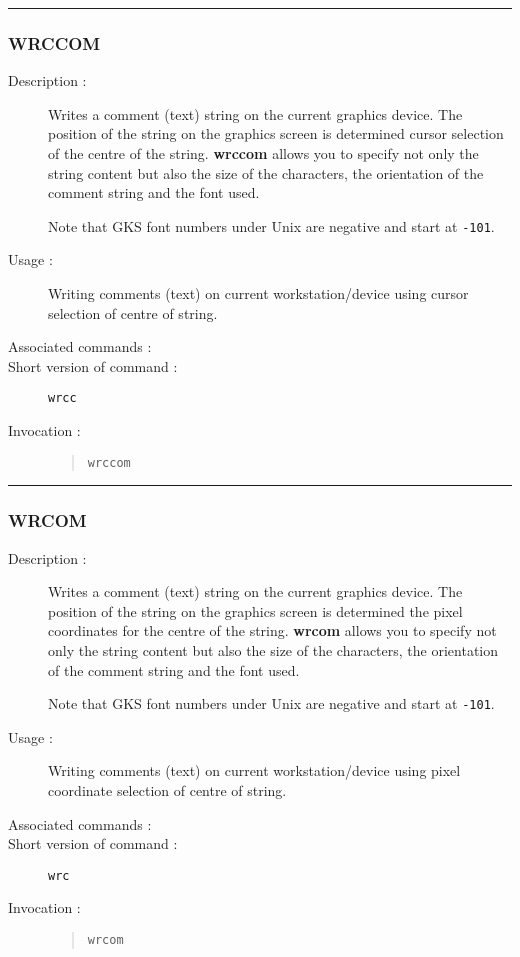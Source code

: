 \hrule 
\subsubsection*{\label{WRCCOM}WRCCOM}

\begin{description}

\item[Description :] Writes a comment (text) string on the current
graphics device.  The position of the string on the graphics screen is
determined cursor selection of the centre of the string.  {\bf wrccom}
allows you to specify not only the string content but also the size of
the characters, the orientation of the comment string and the font
used.

Note that GKS font numbers under Unix are negative and start at {\tt -101}.

\item[Usage :] Writing comments (text) on current workstation/device using 
cursor selection of centre of string.
\item[Associated commands :] {\tt {}}
\item[Short version of command :] {\tt wrcc}
\item[Invocation :]

\begin{quote}{\tt  wrccom }\end{quote}

\end{description}

\hrule 
\subsubsection*{\label{WRCOM}WRCOM}

\begin{description}

\item[Description :] Writes a comment (text) string on the current
graphics device. The position of the string on the graphics screen is
determined the pixel coordinates for the centre of the string.  {\bf
wrcom} allows you to specify not only the string content but also the
size of the characters, the orientation of the comment string and the
font used.

Note that GKS font numbers under Unix are negative and start at {\tt -101}.

\item[Usage :] Writing comments (text) on current workstation/device
using pixel coordinate selection of centre of string.

\item[Associated commands :] {\tt {}}
\item[Short version of command :] {\tt wrc}
\item[Invocation :]

\begin{quote}{\tt  wrcom }\end{quote}

\end{description}

